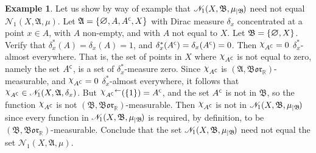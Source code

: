 \documentclass[
twoside=true,
paper=letter,
fontsize=9pt,
pagesize=auto,
leqno,
openany,
headsepline,
overfullrule,
]{scrbook}
\theoremstyle{plain}
\theoremstyle{plain}
\theoremstyle{definition}
\newtheorem{example}[thm]{Example}
\theoremstyle{bfnoteitalic}
\theoremstyle{bfnoteroman}
\newcommand{\sigalg}[1]{\mathfrak{#1}}
\newcommand{\cali}[1]{\mathscr{#1}}
\newcommand{\borel}{\mathfrak{Bor}}
\newcommand{\charfunction}[1]{{\raisebox{2pt}{$\chi$}}_{#1}}
\newcommand{\restrictedto}[1]{_{\lvert#1}\kern-1.5pt}
\newcommand{\mtset}{\hbox{\large{$\varnothing$}}}
\newcommand{\comp}{^{\hbox{\tiny{$\mathsf C$}}}}
\newcommand{\preimage}[1]{#1^{\leftarrow}}
\newcommand{\R}{\mathbb{R}}
\newcommand{\sigmaalgebra}{\sigalg{A}}
\newcommand{\sigmaalgebraii}{\sigalg{B}}
\newcommand{\measurespace}{X}
\newcommand{\mspaceelt}{x}
\newcommand{\measure}{\mu}
\newcommand{\diracmeasure}[1]{\delta_{#1}}
\newcommand{\seti}{A}
\begin{document}
\begin{example}\label{unequal_kernel}
Let us show by way of example that 
$\cali{N}_1(\measurespace, \sigmaalgebraii, \measure\restrictedto{\sigmaalgebraii})$
need not equal 
$\cali{N}_1(\measurespace, \sigmaalgebra, \measure)$.
Let 
$\sigmaalgebra = 
\{ 
\mtset,
\seti,
\seti\comp,
\measurespace
\}$
with Dirac measure $\diracmeasure{\mspaceelt}$ concentrated at a point $\mspaceelt\in\seti$, with $\seti$ non-empty, and with $\seti$ not equal to $\measurespace$. 
Let
$\sigmaalgebraii = 
\{ 
\mtset,
\measurespace
\}$.  Verify that 
$\diracmeasure{\mspaceelt}^*(\seti)=\diracmeasure{\mspaceelt}(\seti)=1$, and
$\diracmeasure{\mspaceelt}^*(\seti\comp)=\diracmeasure{\mspaceelt}(\seti\comp)=0$.
Then $\charfunction{\seti\comp} = 0$ $\diracmeasure{\mspaceelt}^*$-almost everywhere. 
That is, the set of points in $\measurespace$ where $\charfunction{\seti\comp}$ is not equal to zero, namely the set 
$\seti\comp$, is a set of $\diracmeasure{\mspaceelt}^*$-measure zero.
Since $\charfunction{\seti\comp}$ is $(\sigmaalgebra,\borel_\R)$\hyp{}measurable, 
and
$\charfunction{\seti\comp} = 0$ $\diracmeasure{\mspaceelt}^*$-almost everywhere,
it follows that
$\charfunction{\seti\comp}\in
\cali{N}_1(\measurespace, \sigmaalgebra,\diracmeasure{\mspaceelt})$.
But $\preimage{{\charfunction{\seti\comp}}}{(\{1\})} =\seti\comp$, 
and the set $\seti\comp$ is not in $\sigmaalgebraii$, 
so the function 
$\charfunction{\seti\comp}$ is not  $(\sigmaalgebraii,\borel_\R)$\hyp{}measurable. Then 
$\charfunction{\seti\comp}$
is not in 
$\cali{N}_1(\measurespace, \sigmaalgebraii, \measure\restrictedto{\sigmaalgebraii})$
since every function in 
$\cali{N}_1(\measurespace, \sigmaalgebraii, \measure\restrictedto{\sigmaalgebraii})$
is required, by definition, to be 
$(\sigmaalgebraii,\borel_\R)$\hyp{}measurable.
Conclude that the set
$\cali{N}_1(\measurespace, \sigmaalgebraii, \measure\restrictedto{\sigmaalgebraii})$
need not equal the set
$\cali{N}_1(\measurespace, \sigmaalgebra, \measure)$.
\end{example}
\end{document}

